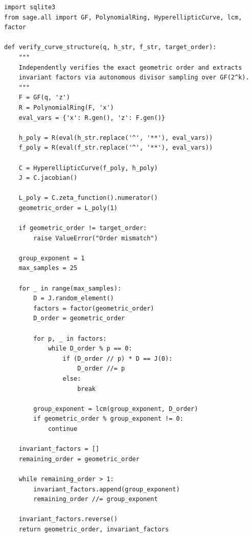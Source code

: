 \documentclass[12pt]{article}
\begin{document}
\begin{verbatim}
import sqlite3
from sage.all import GF, PolynomialRing, HyperellipticCurve, lcm, factor

def verify_curve_structure(q, h_str, f_str, target_order):
    """
    Independently verifies the exact geometric order and extracts 
    invariant factors via autonomous divisor sampling over GF(2^k).
    """
    F = GF(q, 'z')
    R = PolynomialRing(F, 'x')
    eval_vars = {'x': R.gen(), 'z': F.gen()} 
    
    h_poly = R(eval(h_str.replace('^', '**'), eval_vars))
    f_poly = R(eval(f_str.replace('^', '**'), eval_vars))
    
    C = HyperellipticCurve(f_poly, h_poly)
    J = C.jacobian()
    
    L_poly = C.zeta_function().numerator()
    geometric_order = L_poly(1)
    
    if geometric_order != target_order:
        raise ValueError("Order mismatch")
        
    group_exponent = 1
    max_samples = 25  
    
    for _ in range(max_samples):
        D = J.random_element()
        factors = factor(geometric_order)
        D_order = geometric_order
        
        for p, _ in factors:
            while D_order % p == 0:
                if (D_order // p) * D == J(0):
                    D_order //= p
                else:
                    break
                    
        group_exponent = lcm(group_exponent, D_order)
        if geometric_order % group_exponent != 0:
            continue 

    invariant_factors = []
    remaining_order = geometric_order
    
    while remaining_order > 1:
        invariant_factors.append(group_exponent)
        remaining_order //= group_exponent
        
    invariant_factors.reverse() 
    return geometric_order, invariant_factors
\end{verbatim}
\end{document}
